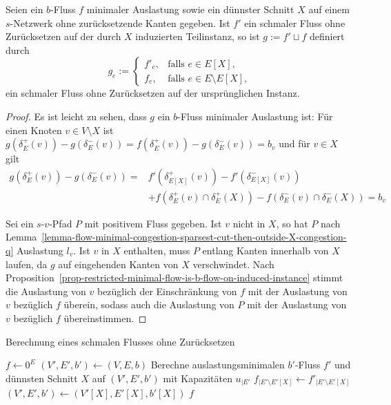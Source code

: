 \begin{corollary}\label{cor-thin-flow-alg-correct}
	Seien ein $b$-Fluss $f$ minimaler Auslastung sowie ein dünnster Schnitt $X$ auf einem $s$-Netzwerk ohne zurücksetzende Kanten gegeben.
	Ist $f'$ ein schmaler Fluss ohne Zurücksetzen auf der durch $X$ induzierten Teilinstanz, so ist $g := f' \sqcup f$ definiert durch \[
		g_e := \begin{cases}
			f'_e, & \text{falls $e\in E[X]$,} \\
			f_e, & \text{falls $e\in E\setminus E[X]$,}
		\end{cases}
	\] ein schmaler Fluss ohne Zurücksetzen auf der ursprünglichen Instanz.
\end{corollary}
\begin{proof}
	Es ist leicht zu sehen, dass $g$ ein $b$-Fluss minimaler Auslastung ist:
	Für einen Knoten $v \in V\setminus X$ ist $g(\delta^+_E(v)) - g(\delta^-_E(v)) = f(\delta^+_E(v)) - g(\delta^-_E(v)) = b_v$ und für $v\in X$ gilt
	\begin{align*}
	g(\delta^+_E(v)) - g(\delta^-_E(v)) =& f'(\delta^+_{E[X]}(v))  - f'(\delta^-_{E[X]}(v))  \\
	&+ f(\delta^+_E(v)\cap\delta^+_E(X)) - f(\delta^-_E(v)\cap\delta^-_E(X)) = b_v
	\end{align*}

	Sei ein $s$-$v$-Pfad $P$ mit positivem Fluss gegeben.
	Ist $v$ nicht in $X$, so hat $P$ nach Lemma~\ref{lemma-flow-minimal-congestion-sparsest-cut-then-outside-X-congestion-q} Auslastung $l_v$.
	Ist $v$ in $X$ enthalten, muss $P$ entlang Kanten innerhalb von $X$ laufen, da $g$ auf eingehenden Kanten von $X$ verschwindet.
	Nach Proposition~\ref{prop-restricted-minimal-flow-is-b-flow-on-induced-instance} stimmt die Auslastung von $v$ bezüglich der Einschränkung von $f$ mit der Auslastung von $v$ bezüglich $f$ überein, sodass auch die Auslastung von $P$ mit der Auslastung von $v$ bezüglich $f$ übereinstimmen.
\end{proof}

\begin{algorithm}
\caption{Berechnung eines schmalen Flusses ohne Zurücksetzen}
\label{algorithm-computation-thin-flow-without-resetting}
\begin{algorithmic}[1]
	\State $f \gets 0^E$
	\State $(V', E', b') \gets (V, E, b)$
	\State Berechne auslastungsminimalen $b'$-Fluss $f'$ und dünnsten Schnitt $X$
	\Statex auf $(V', E', b')$ mit Kapazitäten $u_{\mid E'}$
	\State $f_{\mid E'\setminus E'[X]} \gets f'_{\mid E'\setminus E'[X]}$
	\State $(V', E', b') \gets (V'[X], E'[X], b'[X])$
	\EndWhile
	\State\Return $f$
	\EndProcedure
\end{algorithmic}
\end{algorithm}

